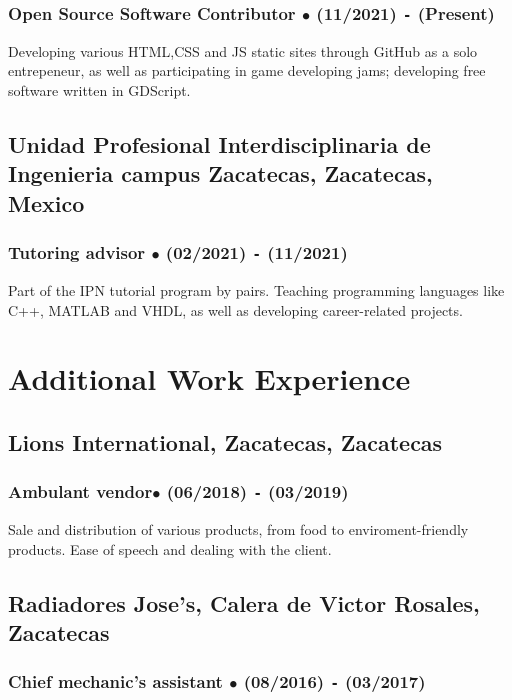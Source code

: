 \documentclass{article}
\begin{document}
  \subsubsection{Open Source Software Contributor $\bullet$ (11/2021) \texttt{-} (Present)}

  Developing various HTML,CSS and JS static sites through GitHub as a solo entrepeneur, as well as participating in game developing jams; developing free software written in GDScript.

  \subsection{Unidad Profesional Interdisciplinaria de Ingenieria campus Zacatecas, Zacatecas, Mexico}

  \subsubsection{Tutoring advisor $\bullet$ (02/2021) \texttt{-} (11/2021)}

  Part of the IPN tutorial program by pairs. Teaching programming languages like C++, MATLAB and VHDL, as well as developing career-related projects.%


  \section{Additional Work Experience}%

  \subsection{\textbf{Lions International}, Zacatecas, Zacatecas}

  \subsubsection{Ambulant vendor$\bullet$ (06/2018) \texttt{-} (03/2019)}

  Sale and distribution of various products, from food to enviroment-friendly products. Ease of speech and dealing with the client.

  \subsection{\textbf{Radiadores Jose's}, Calera de Victor Rosales, Zacatecas}

  \subsubsection{Chief mechanic's assistant $\bullet$ (08/2016) \texttt{-} (03/2017)}
\end{document}
